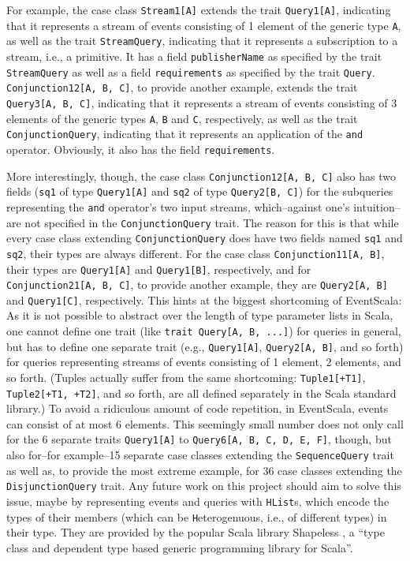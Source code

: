 \documentclass[article, type=bsc, colorback, accentcolor=tud8b, parskip=half, bibliography=totocnumbered]{tudthesis}
\begin{document}
For example, the case class \lstinline{Stream1[A]} extends the trait \lstinline{Query1[A]}, indicating that it represents a stream of events consisting of 1 element of the generic type \lstinline{A}, as well as the trait \lstinline{StreamQuery}, indicating that it represents a subscription to a stream, i.e., a primitive.
It has a field \lstinline{publisherName} as specified by the trait \lstinline{StreamQuery} as well as a field \lstinline{requirements} as specified by the trait \lstinline{Query}.
\lstinline{Conjunction12[A, B, C]}, to provide another example, extends the trait \lstinline{Query3[A, B, C]}, indicating that it represents a stream of events consisting of 3 elements of the generic types \lstinline{A}, \lstinline{B} and \lstinline{C}, respectively, as well as the trait \lstinline{ConjunctionQuery}, indicating that it represents an application of the \lstinline{and} operator.
Obviously, it also has the field \lstinline{requirements}.

More interestingly, though, the case class \lstinline{Conjunction12[A, B, C]} also has two fields (\lstinline{sq1} of type \lstinline{Query1[A]} and \lstinline{sq2} of type \lstinline{Query2[B, C]}) for the subqueries representing the \lstinline{and} operator's two input streams, which--against one's intuition--are not specified in the \lstinline{ConjunctionQuery} trait.
The reason for this is that while every case class extending \lstinline{ConjunctionQuery} does have two fields named \lstinline{sq1} and \lstinline{sq2}, their types are always different.
For the case class \lstinline{Conjunction11[A, B]}, their types are \lstinline{Query1[A]} and \lstinline{Query1[B]}, respectively, and for \lstinline{Conjunction21[A, B, C]}, to provide another example, they are \lstinline{Query2[A, B]} and \lstinline{Query1[C]}, respectively.
This hints at the biggest shortcoming of EventScala:
As it is not possible to abstract over the length of type parameter lists in Scala, one cannot define one trait (like \lstinline{trait Query[A, B, ...]}) for queries in general, but has to define one separate trait (e.g., \lstinline{Query1[A]}, \lstinline{Query2[A, B]}, and so forth) for queries representing streams of events consisting of 1 element, 2 elements, and so forth.
(Tuples actually suffer from the same shortcoming: \lstinline{Tuple1[+T1]}, \lstinline{Tuple2[+T1, +T2]}, and so forth, are all defined separately in the Scala standard library.)
To avoid a ridiculous amount of code repetition, in EventScala, events can consist of at most 6 elements.
This seemingly small number does not only call for the 6 separate traits \lstinline{Query1[A]} to \lstinline{Query6[A, B, C, D, E, F]}, though, but also for--for example--15 separate case classes extending the \lstinline{SequenceQuery} trait as well as, to provide the most extreme example, for 36 case classes extending the \lstinline{DisjunctionQuery} trait.
Any future work on this project should aim to solve this issue, maybe by representing events and queries with \lstinline{HList}s, which encode the types of their members (which can be \lstinline{H}eterogenuous, i.e., of different types) in their type. They are provided by the popular Scala library Shapeless \cite{shapeless}, a ``type class and dependent type based generic programming library for Scala''.
\end{document}
